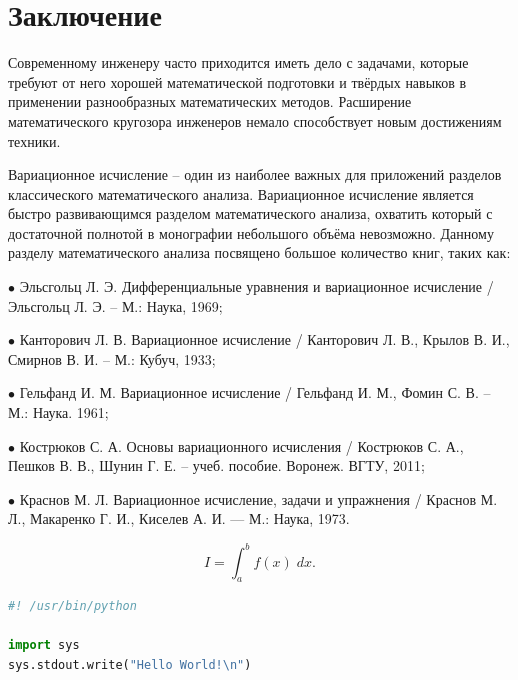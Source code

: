 \documentclass{article}
\begin{document}
\newpage

\section*{Заключение}

Современному инженеру часто приходится иметь дело с задачами, которые требуют от него хорошей математической подготовки и твёрдых навыков в применении разнообразных математических методов. Расширение математического кругозора инженеров немало способствует новым достижениям техники.

Вариационное исчисление – один из наиболее важных для приложений разделов классического математического анализа. Вариационное исчисление является быстро развивающимся разделом математического анализа, охватить который с достаточной полнотой в монографии небольшого объёма невозможно. Данному разделу математического анализа посвящено большое количество книг, таких как:

$\bullet$ Эльсгольц Л. Э. Дифференциальные уравнения и вариационное исчисление / Эльсгольц Л. Э. – М.: Наука, 1969;

$\bullet$ Канторович Л. В. Вариационное исчисление / Канторович Л. В., Крылов В. И., Смирнов В. И. – М.: Кубуч, 1933;

$\bullet$ Гельфанд И. М. Вариационное исчисление / Гельфанд И. М., Фомин С. В. – М.: Наука. 1961;

$\bullet$ Кострюков С. А. Основы вариационного исчисления / Кострюков С. А., Пешков В. В., Шунин Г. Е. – учеб. пособие. Воронеж. ВГТУ, 2011;

$\bullet$ Краснов М. Л. Вариационное исчисление, задачи и упражнения / Краснов М. Л., Макаренко Г. И., Киселев А. И.  — М.: Наука, 1973.


\newpage



\begin{equation}
	I = \int_{a}^{b} f(x) \; dx.
\end{equation}

\begin{file}[hello.py]
\begin{lstlisting}[language=Python]
#! /usr/bin/python

import sys
sys.stdout.write("Hello World!\n")
\end{lstlisting}
\end{file}
\end{document}
